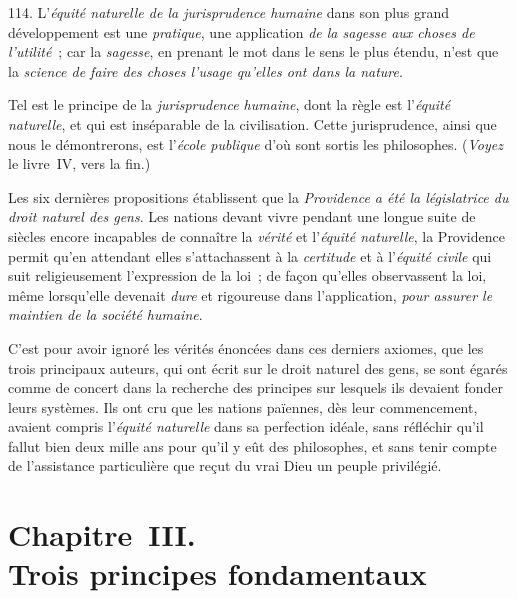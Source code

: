 \documentclass[french,twoside]{book} %
\newcommand\chapteropen{} %
\newcommand\chapterclose{} %
\begin{document}
114. L’{\itshape équité naturelle de la jurisprudence humaine} dans son plus grand développement est une {\itshape pratique}, une application {\itshape de la sagesse aux choses de l’utilité} ; car la {\itshape sagesse}, en prenant le mot dans le sens le plus étendu, n’est que la {\itshape science de faire des choses l’usage qu’elles ont dans la nature}.\par
Tel est le principe de la {\itshape jurisprudence humaine}, dont la règle est l’{\itshape équité naturelle}, et qui est inséparable  de la civilisation. Cette jurisprudence, ainsi que nous le démontrerons, est l’{\itshape école publique} d’où sont sortis les philosophes. ({\itshape Voyez} le livre IV, vers la fin.)\par
Les six dernières propositions établissent que la {\itshape Providence a été la législatrice du droit naturel des gens}. Les nations devant vivre pendant une longue suite de siècles encore incapables de connaître la {\itshape vérité} et l’{\itshape équité naturelle}, la Providence permit qu’en attendant elles s’attachassent à la {\itshape certitude} et à l’{\itshape équité civile} qui suit religieusement l’expression de la loi ; de façon qu’elles observassent la loi, même lorsqu’elle devenait {\itshape dure} et rigoureuse dans l’application, {\itshape pour assurer le maintien de la société humaine}.\par
C’est pour avoir ignoré les vérités énoncées dans ces derniers axiomes, que les trois principaux auteurs, qui ont écrit sur le droit naturel des gens, se sont égarés comme de concert dans la recherche des principes sur lesquels ils devaient fonder leurs systèmes. Ils ont cru que les nations païennes, dès leur commencement, avaient compris l’{\itshape équité naturelle} dans sa perfection idéale, sans réfléchir qu’il fallut bien deux mille ans pour qu’il y eût des philosophes, et sans tenir compte de l’assistance particulière que reçut du vrai Dieu un peuple privilégié.
\chapterclose


\chapteropen
\chapter[{Chapitre III. Trois principes fondamentaux}]{Chapitre III. \\
Trois principes fondamentaux}
\end{document}
